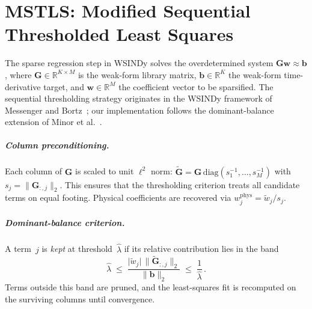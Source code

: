 \chapter{MSTLS: Modified Sequential Thresholded Least Squares}
\label{app:mstls}
\enlargethispage{3\baselineskip}

The sparse regression step in WSINDy solves the overdetermined system
$\mathbf{G}\mathbf{w} \approx \mathbf{b}$, where $\mathbf{G}\in\mathbb{R}^{K\times M}$
is the weak-form library matrix, $\mathbf{b}\in\mathbb{R}^K$ the weak-form
time-derivative target, and $\mathbf{w}\in\mathbb{R}^M$ the coefficient vector
to be sparsified.  The sequential thresholding strategy originates
in the WSINDy framework of Messenger and
Bortz~\cite{messenger2021wsindy}; our implementation follows the
dominant-balance extension of Minor et al.~\cite{minor2025mstls}.

\paragraph{Column preconditioning.}
Each column of $\mathbf{G}$ is scaled to unit $\ell^2$ norm:
$\tilde{\mathbf{G}} = \mathbf{G}\,\mathrm{diag}(s_1^{-1},\dots,s_M^{-1})$
with $s_j = \lVert \mathbf{G}_{:,j}\rVert_2$.  This ensures
that the thresholding criterion treats all candidate terms on equal footing.
Physical coefficients are recovered via $w_j^{\mathrm{phys}} = \tilde w_j / s_j$.

\paragraph{Dominant-balance criterion.}
A term~$j$ is \emph{kept} at threshold~$\hat\lambda$ if its relative
contribution lies in the band
\[
  \hat\lambda \;\le\;
  \frac{\lvert \tilde w_j\rvert\,\lVert \tilde{\mathbf{G}}_{:,j}\rVert_2}
       {\lVert \mathbf{b}\rVert_2}
  \;\le\;
  \frac{1}{\hat\lambda}\,.
\]
Terms outside this band are pruned, and the least-squares fit is recomputed
on the surviving columns until convergence.

